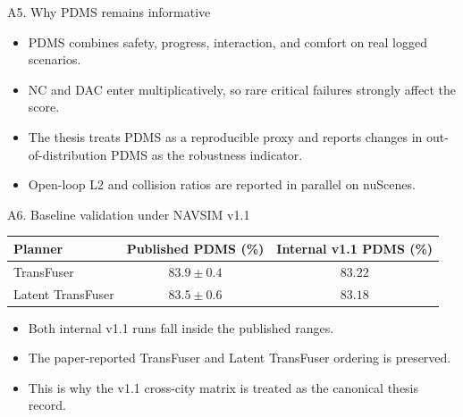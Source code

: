 \documentclass[aspectratio=169, xcolor={table}]{beamer}
\begin{document}
\begin{frame}{A5. Why PDMS remains informative}
  \begin{itemize}
    \item PDMS combines safety, progress, interaction, and comfort on real logged scenarios.
    \item NC and DAC enter multiplicatively, so rare critical failures strongly affect the score.
    \item The thesis treats PDMS as a reproducible proxy and reports changes in out-of-distribution PDMS as the robustness indicator.
    \item Open-loop L2 and collision ratios are reported in parallel on nuScenes.
  \end{itemize}
\end{frame}

\begin{frame}{A6. Baseline validation under NAVSIM v1.1}
  \centering\small
  \begin{tabular}{@{}l c c@{}}
    \toprule
    \textbf{Planner} & \textbf{Published PDMS (\%)} & \textbf{Internal v1.1 PDMS (\%)} \\
    \midrule
    TransFuser & $83.9\pm0.4$ & $83.22$ \\
    Latent TransFuser & $83.5\pm0.6$ & $83.18$ \\
    \bottomrule
  \end{tabular}
  \vspace{8pt}
  \begin{itemize}\footnotesize
    \item Both internal v1.1 runs fall inside the published ranges.
    \item The paper-reported TransFuser and Latent TransFuser ordering is preserved.
    \item This is why the v1.1 cross-city matrix is treated as the canonical thesis record.
  \end{itemize}
\end{frame}
\end{document}
